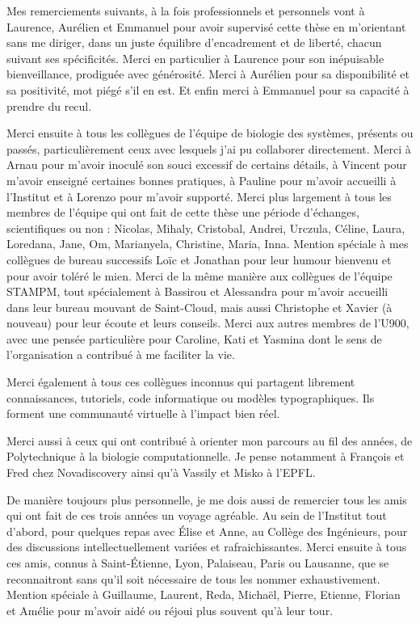 \documentclass[a4paper,12pt,twoside,onecolumn,openright,final,oldfontcommands]{memoir}
\begin{document}
Mes remerciements suivants, à la fois professionnels et personnels vont
à Laurence, Aurélien et Emmanuel pour avoir supervisé cette thèse en
m'orientant sans me diriger, dans un juste équilibre d'encadrement et de
liberté, chacun suivant ses spécificités. Merci en particulier à
Laurence pour son inépuisable bienveillance, prodiguée avec générosité.
Merci à Aurélien pour sa disponibilité et sa positivité, mot piégé s'il
en est. Et enfin merci à Emmanuel pour sa capacité à prendre du recul.

Merci ensuite à tous les collègues de l'équipe de biologie des systèmes,
présents ou passés, particulièrement ceux avec lesquels j'ai pu
collaborer directement. Merci à Arnau pour m'avoir inoculé son souci
excessif de certains détails, à Vincent pour m'avoir enseigné certaines
bonnes pratiques, à Pauline pour m'avoir accueilli à l'Institut et à
Lorenzo pour m'avoir supporté. Merci plus largement à tous les membres
de l'équipe qui ont fait de cette thèse une période d'échanges,
scientifiques ou non : Nicolas, Mihaly, Cristobal, Andrei, Urczula,
Céline, Laura, Loredana, Jane, Om, Marianyela, Christine, Maria, Inna.
Mention spéciale à mes collègues de bureau successifs Loïc et Jonathan
pour leur humour bienvenu et pour avoir toléré le mien. Merci de la même
manière aux collègues de l'équipe STAMPM, tout spécialement à Bassirou
et Alessandra pour m'avoir accueilli dans leur bureau mouvant de
Saint-Cloud, mais aussi Christophe et Xavier (à nouveau) pour leur
écoute et leurs conseils. Merci aux autres membres de l'U900, avec une
pensée particulière pour Caroline, Kati et Yasmina dont le sens de
l'organisation a contribué à me faciliter la vie.

Merci également à tous ces collègues inconnus qui partagent librement
connaissances, tutoriels, code informatique ou modèles typographiques.
Ils forment une communauté virtuelle à l'impact bien réel.

Merci aussi à ceux qui ont contribué à orienter mon parcours au fil des
années, de Polytechnique à la biologie computationnelle. Je pense
notamment à François et Fred chez Novadiscovery ainsi qu'à Vassily et
Misko à l'EPFL.

De manière toujours plus personnelle, je me dois aussi de remercier tous
les amis qui ont fait de ces trois années un voyage agréable. Au sein de
l'Institut tout d'abord, pour quelques repas avec Élise et Anne, au
Collège des Ingénieurs, pour des discussions intellectuellement variées
et rafraichissantes. Merci ensuite à tous ces amis, connus à
Saint-Étienne, Lyon, Palaiseau, Paris ou Lausanne, que se reconnaitront
sans qu'il soit nécessaire de tous les nommer exhaustivement. Mention
spéciale à Guillaume, Laurent, Reda, Michaël, Pierre, Etienne, Florian
et Amélie pour m'avoir aidé ou réjoui plus souvent qu'à leur tour.
\end{document}
